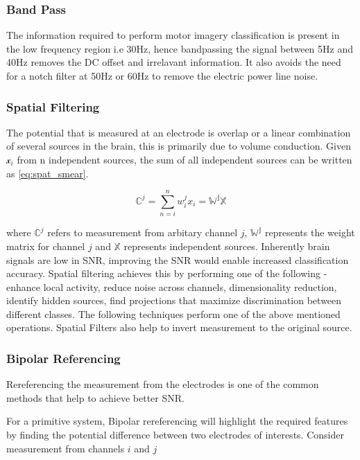 \subsubsection{Band Pass}
The information required to perform motor imagery classification is present in the low frequency region i.e 30Hz, hence bandpassing the signal between 5Hz and 40Hz removes the DC offset and irrelavant information. It also avoids the need for a notch filter at 50Hz or 60Hz to remove the electric power line noise. 

\subsubsection{Spatial Filtering}
The potential that is measured at an electrode is overlap or a linear combination of several sources in the brain, this is primarily due to volume conduction. Given $\mathcal{x}_i$ from n independent sources, the sum of all independent sources can be written as \ref{eq:spat_smear}.

\begin{equation} \label{eq:spat_smear}
    \mathbb{C}^{j} = \sum_{n = i}^{n} w_{i}^{j} x_{i} = \mathbb{W^{j} X} 
\end{equation}

where $\mathbb{C}^{j} $ refers to measurement from arbitary channel $j$,  $\mathbb{W^j}$ represents the weight matrix for channel $j$ and $\mathbb{X}$ represents independent sources. Inherently brain signals are low in SNR, improving the SNR would enable increased classification accuracy. Spatial filtering achieves this by performing one of the following - enhance local activity, reduce noise across channels, dimensionality reduction, identify hidden sources, find projections that maximize discrimination between different classes. The following techniques perform one of the above mentioned operations. Spatial Filters also help to invert measurement to the
original source.

\subsubsection{Bipolar Referencing}
Rereferencing the measurement from the electrodes is one of the common methods that help to achieve better SNR.

For a primitive system, Bipolar rereferencing will highlight the required features by finding the potential difference between two electrodes of interests. Consider measurement from channels $i$ and $j$

